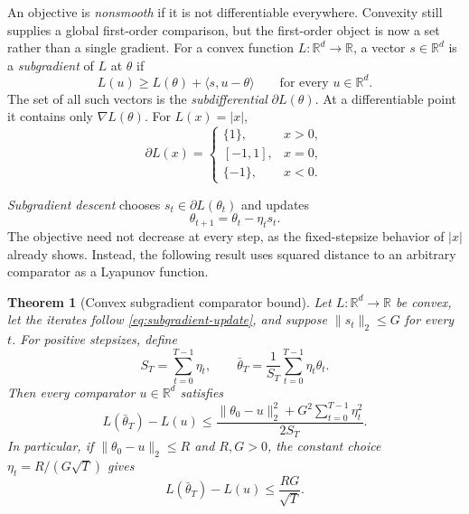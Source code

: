 \documentclass[11pt,twoside]{article}
\newcommand{\R}{\mathbb R}
\newtheorem{theorem}{Theorem}[section]
\theoremstyle{definition}
\theoremstyle{remark}
\begin{document}
An objective is \emph{nonsmooth} if it is not differentiable everywhere.
Convexity still supplies a global first-order comparison, but the first-order
object is now a set rather than a single gradient. For a convex function
$L:\R^d\to\R$, a vector $s\in\R^d$ is a \emph{subgradient} of $L$ at
$\theta$ if
\begin{equation}
 L(u)\ge L(\theta)+\langle s,u-\theta\rangle
 \qquad\text{for every }u\in\R^d.
 \label{eq:subgradient-definition}
\end{equation}
The set of all such vectors is the \emph{subdifferential}
$\partial L(\theta)$. At a differentiable point it contains only
$\nabla L(\theta)$. For $L(x)=|x|$,
\[
 \partial L(x)=
 \begin{cases}
  \{1\},&x>0,\\
  [-1,1],&x=0,\\
  \{-1\},&x<0.
 \end{cases}
\]

\emph{Subgradient descent} chooses $s_t\in\partial L(\theta_t)$ and updates
\begin{equation}
 \theta_{t+1}=\theta_t-\eta_t s_t.
 \label{eq:subgradient-update}
\end{equation}
The objective need not decrease at every step, as the fixed-stepsize behavior
of $|x|$ already shows. Instead, the following result uses squared distance
to an arbitrary comparator as a Lyapunov function.

\begin{theorem}[Convex subgradient comparator bound]
\label{thm:subgradient-comparator}
Let $L:\R^d\to\R$ be convex, let the iterates follow
\cref{eq:subgradient-update}, and suppose $\|s_t\|_2\le G$ for every $t$.
For positive stepsizes, define
\[
 S_T=\sum_{t=0}^{T-1}\eta_t,
 \qquad
 \bar\theta_T=\frac1{S_T}\sum_{t=0}^{T-1}\eta_t\theta_t.
\]
Then every comparator $u\in\R^d$ satisfies
\begin{equation}
 L(\bar\theta_T)-L(u)
 \le
 \frac{\|\theta_0-u\|_2^2
       +G^2\sum_{t=0}^{T-1}\eta_t^2}{2S_T}.
 \label{eq:subgradient-comparator}
\end{equation}
In particular, if $\|\theta_0-u\|_2\le R$ and $R,G>0$, the constant choice
$\eta_t=R/(G\sqrt T)$ gives
\begin{equation}
 L(\bar\theta_T)-L(u)\le\frac{RG}{\sqrt T}.
 \label{eq:subgradient-rate}
\end{equation}
\end{theorem}
\end{document}
